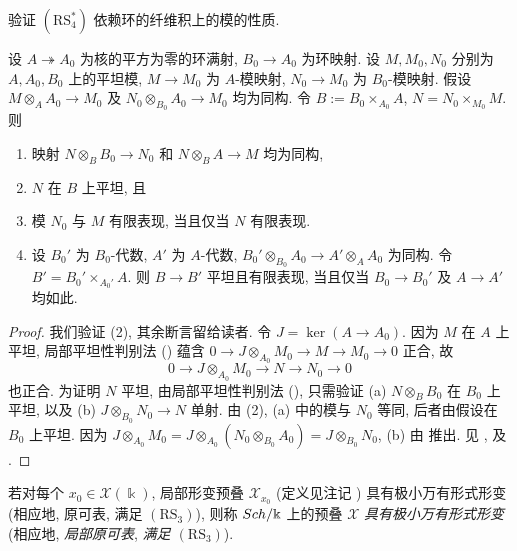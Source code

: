 验证 $(\mathrm{RS}_4^*)$ 依赖环的纤维积上的模的性质.
\begin{lemma}\label{src:C.4.12}
设 $A\twoheadrightarrow A_0$ 为核的平方为零的环满射, $B_0\to A_0$ 为环映射. 设 $M,M_0,N_0$ 分别为 $A,A_0,B_0$ 上的平坦模, $M\to M_0$ 为 $A$-模映射, $N_0\to M_0$ 为 $B_0$-模映射. 假设 $M\otimes_AA_0\to M_0$ 及 $N_0\otimes_{B_0}A_0\to M_0$ 均为同构. 令 $B:=B_0\times_{A_0}A$, $N=N_0\times_{M_0}M$. 则
\begin{enumerate}[(1)]
\item 映射 $N\otimes_BB_0\to N_0$ 和 $N\otimes_BA\to M$ 均为同构,
\item $N$ 在 $B$ 上平坦, 且
\item 模 $N_0$ 与 $M$ 有限表现, 当且仅当 $N$ 有限表现.
\item 设 $B_0'$ 为 $B_0$-代数, $A'$ 为 $A$-代数, $B_0'\otimes_{B_0}A_0\to A'\otimes_AA_0$ 为同构. 令 $B'=B_0'\times_{A_0'}A$. 则 $B\to B'$ 平坦且有限表现, 当且仅当 $B_0\to B_0'$ 及 $A\to A'$ 均如此.
\end{enumerate}
\end{lemma}
\begin{proof}
我们验证 (2), 其余断言留给读者. 令 $J=\ker(A\to A_0)$. 因为 $M$ 在 $A$ 上平坦, 局部平坦性判别法 () 蕴含 $0\to J\otimes_{A_0}M_0\to M\to M_0\to0$ 正合, 故
\begin{equation}\label{src:C.4.13}
0\to J\otimes_{A_0}M_0\to N\to N_0\to0
\end{equation}
也正合. 为证明 $N$ 平坦, 由局部平坦性判别法 (), 只需验证 (a) $N\otimes_BB_0$ 在 $B_0$ 上平坦, 以及 (b) $J\otimes_{B_0}N_0\to N$ 单射. 由 (2), (a) 中的模与 $N_0$ 等同, 后者由假设在 $B_0$ 上平坦. 因为 $J\otimes_{A_0}M_0=J\otimes_{A_0}(N_0\otimes_{B_0}A_0)=J\otimes_{B_0}N_0$, (b) 由  推出. 见 \cite[引理 $3.4$]{Sch68}, \cite[命题 $16.4$]{Har10} 及 \cite[Tags 08KG, 0D2G 和 0D2K]{SP}.
\end{proof}
若对每个 $x_0\in\mathcal X(\Bbbk)$, 局部形变预叠 $\mathcal X_{x_0}$ (定义见注记 ) 具有极小万有形式形变 (相应地, 原可表, 满足 $(\mathrm{RS}_3)$), 则称 $Sch/\Bbbk$ 上的预叠 $\mathcal X$ \textit{具有极小万有形式形变} (相应地, \textit{局部原可表}, \textit{满足 $(\mathrm{RS}_3)$}).
